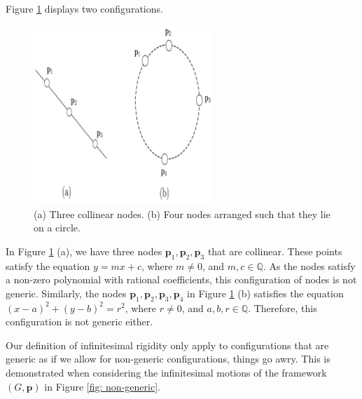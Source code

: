 \begin{example}
Figure \ref{fig: not generic points} displays two configurations.

    \begin{figure}[htbp]
        \centering
        \includegraphics[width = 0.6\textwidth]{Chapter 2/17. not generic.png}
        \caption{(a) Three collinear nodes. (b) Four nodes arranged such that they lie on a circle.}
        \label{fig: not generic points}
    \end{figure}

\noindent
In Figure \ref{fig: not generic points} (a), we have three nodes $\mathbf{p}_1, \mathbf{p}_2, \mathbf{p}_3$ that are collinear. These points satisfy the equation $y = mx + c$, where $m \neq 0$, and $ m,c \in \mathbb{Q}$. As the nodes satisfy a non-zero polynomial with rational coefficients, this configuration of nodes is not generic. Similarly, the nodes $\mathbf{p}_1, \mathbf{p}_2, \mathbf{p}_3, \mathbf{p}_4$ in Figure \ref{fig: not generic points} (b) satisfies the equation $(x-a)^2 + (y-b)^2 = r^2$, where $r \neq 0$, and $a,b,r \in \mathbb{Q}$. Therefore, this configuration is not generic either.
\end{example}


\begin{flushleft}
Our definition of infinitesimal rigidity only apply to configurations that are generic as if we allow for non-generic configurations, things go awry. This is demonstrated when considering the infinitesimal motions of the framework $(G,\mathbf{p})$ in Figure \ref{fig: non-generic}.
\end{flushleft}

